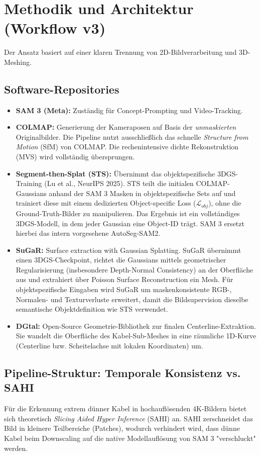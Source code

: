 \documentclass[12pt,a4paper]{article}
\begin{document}
\section{Methodik und Architektur (Workflow v3)}
Der Ansatz basiert auf einer klaren Trennung von 2D-Bildverarbeitung und 3D-Meshing.

\subsection{Software-Repositories}
\begin{itemize}
    \item \textbf{SAM 3 (Meta):} Zuständig für Concept-Prompting und Video-Tracking.
    \item \textbf{COLMAP:} Generierung der Kameraposen auf Basis der \textit{unmaskierten} Originalbilder. Die Pipeline nutzt ausschließlich das schnelle \textit{Structure from Motion} (SfM) von COLMAP. Die rechenintensive dichte Rekonstruktion (MVS) wird vollständig übersprungen.
    \item \textbf{Segment-then-Splat (STS):} Übernimmt das objektspezifische 3DGS-Training (Lu et al., NeurIPS 2025). STS teilt die initialen COLMAP-Gaussians anhand der SAM 3 Masken in objektspezifische Sets auf und trainiert diese mit einem dedizierten Object-specific Loss ($\mathcal{L}_{obj}$), ohne die Ground-Truth-Bilder zu manipulieren. Das Ergebnis ist ein vollständiges 3DGS-Modell, in dem jeder Gaussian eine Object-ID trägt. SAM 3 ersetzt hierbei das intern vorgesehene AutoSeg-SAM2.
    \item \textbf{SuGaR:} Surface extraction with Gaussian Splatting. SuGaR übernimmt einen 3DGS-Checkpoint, richtet die Gaussians mittels geometrischer Regularisierung (insbesondere Depth-Normal Consistency) an der Oberfläche aus und extrahiert über Poisson Surface Reconstruction ein Mesh. Für objektspezifische Eingaben wird SuGaR um maskenkonsistente RGB-, Normalen- und Texturverluste erweitert, damit die Bildsupervision dieselbe semantische Objektdefinition wie STS verwendet.
    \item \textbf{DGtal:} Open-Source Geometrie-Bibliothek zur finalen Centerline-Extraktion. Sie wandelt die Oberfläche des Kabel-Sub-Meshes in eine räumliche 1D-Kurve (Centerline bzw. Scheitelachse mit lokalen Koordinaten) um.
\end{itemize}

\subsection{Pipeline-Struktur: Temporale Konsistenz vs. SAHI}
Für die Erkennung extrem dünner Kabel in hochauflösenden 4K-Bildern bietet sich theoretisch \textit{Slicing Aided Hyper Inference} (SAHI) an. SAHI zerschneidet das Bild in kleinere Teilbereiche (Patches), wodurch verhindert wird, dass dünne Kabel beim Downscaling auf die native Modellauflösung von SAM 3 "verschluckt" werden.
\end{document}
